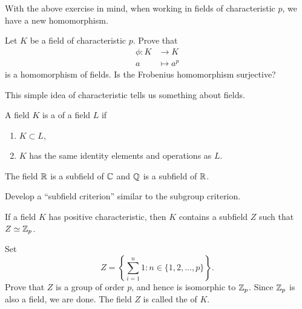 \documentclass{ximera}
\begin{document}
With the above exercise in mind, when working in fields of
characteristic $p$, we have a new homomorphism.

\begin{example}
  Let $K$ be a field of characteristic $p$. Prove that
  \begin{align*}
    \phi:K &\to K\\
    a &\mapsto a^p
  \end{align*}
  is a homomorphism of fields. Is the Frobenius homomorphism surjective?
\end{example}





This simple idea of characteristic tells us something about fields.

\begin{definition}
  A field $K$ is a  of a field $L$ if
  \begin{enumerate}
  \item $K\subset L$,
  \item $K$ has the same identity elements and operations as $L$.
  \end{enumerate}
\end{definition}

\begin{example}[Subfields]
  The field $\mathbb R$ is a subfield of $\mathbb C$ and $\mathbb Q$ is a subfield of $\mathbb R$.
\end{example}


\begin{exercise}
  Develop a ``subfield criterion'' similar to the subgroup criterion.
\end{exercise}


\begin{theorem}\label{T:bfpc}
  If a field $K$ has positive characteristic, then $K$ contains a
  subfield $Z$ such that $Z\simeq \mathbb Z_p$.
  \begin{sketch}
    Set
    \[
    Z =\left\{\sum_{i=1}^n 1:n\in\{1,2,\dots,p\}\right\}.
    \]
    Prove that $Z$ is a group of order $p$, and hence is isomorphic to
    $\mathbb Z_p$. Since $\mathbb Z_p$ is also a field, we are done. The field $Z$
    is called the  of $K$.
  \end{sketch}
\end{theorem}
\end{document}
